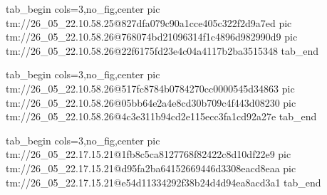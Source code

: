 
 
 
 
 

\qqSecCmtScr


\ifcmt
  tab_begin cols=3,no_fig,center
    pic tm://26_05_22.10.58.25@827dfa079c90a1cce405c322f2d9a7ed
    pic tm://26_05_22.10.58.26@768074bd21096314f1c4896d982990d9
    pic tm://26_05_22.10.58.26@22f6175fd23e4c04a4117b2ba3515348
  tab_end
\fi


\ifcmt
  tab_begin cols=3,no_fig,center
    pic tm://26_05_22.10.58.26@517fc8784b0784270cc0000545d34863
    pic tm://26_05_22.10.58.26@05bb64e2a4e8cd30b709c4f443d08230
    pic tm://26_05_22.10.58.26@4c3e311b94cd2e115ecc3fa1cd92a27e
  tab_end
\fi


\ifcmt
  tab_begin cols=3,no_fig,center
    pic tm://26_05_22.17.15.21@1fb8c5ca8127768f82422c8d10df22e9
    pic tm://26_05_22.17.15.21@d95fa2ba64152669446d3308eacd8eaa
    pic tm://26_05_22.17.15.21@e54d11334292f38b24d4d94ea8acd3a1
  tab_end
\fi

